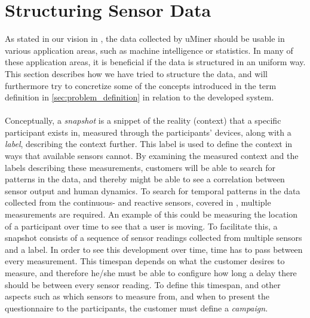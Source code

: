 
\section{Structuring Sensor Data}
\label{sec:modeling_sensor_data}

As stated in our vision in , the data collected by uMiner should be usable in various application areas, such as machine intelligence or statistics. In many of these application areas, it is beneficial if the data is structured in an uniform way. This section describes how we have tried to structure the data, and will furthermore try to concretize some of the concepts introduced in the term definition in \ref{sec:problem_definition} in relation to the developed system. 
\\\\
Conceptually, a \emph{snapshot} is a snippet of the reality (context) that a specific participant exists in, measured through the participants' devices, along with a \emph{label}, describing the context further. This label is used to define the context in ways that available sensors cannot. By examining the measured context and the labels describing these measurements, customers will be able to search for patterns in the data, and thereby might be able to see a correlation between sensor output and human dynamics. To search for temporal patterns in the data collected from the continuous- and reactive sensors, covered in , multiple measurements are required. An example of this could be measuring the location of a participant over time to see that a user is moving. To facilitate this, a snapshot consists of a sequence of sensor readings collected from multiple sensors and a label. In order to see this development over time, time has to pass between every measurement. This timespan depends on what the customer desires to measure, and therefore he/she must be able to configure how long a delay there should be between every sensor reading. To define this timespan, and other aspects such as which sensors to measure from, and when to present the questionnaire to the participants, the customer must define a \emph{campaign}.
\\\\
